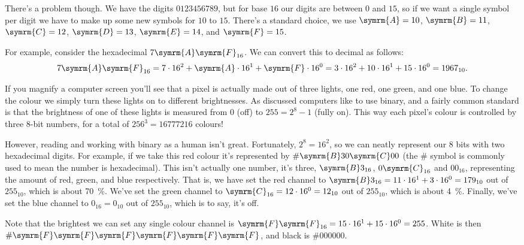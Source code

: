 \documentclass[fleqn]{LectureClass/LectureClass}
\newcommand{\hexadecimaldigit}[1]{\symrm{#1}}
\begin{document}
    There's a problem though.
    We have the digits \(0123456789\), but for base \(16\) our digits are between \(0\) and \(15\), so if we want a single symbol per digit we have to make up some new symbols for \(10\) to \(15\).
    There's a standard choice, we use \(\hexadecimaldigit{A} = 10\), \(\hexadecimaldigit{B} = 11\), \(\hexadecimaldigit{C} = 12\), \(\hexadecimaldigit{D} = 13\), \(\hexadecimaldigit{E} = 14\), and \(\hexadecimaldigit{F} = 15\).
    
    For example, consider the hexadecimal \(7\hexadecimaldigit{A}\hexadecimaldigit{F}_{16}\).
    We can convert this to decimal as follows:
    \begin{equation}
        7\hexadecimaldigit{A}\hexadecimaldigit{F}_{16} = 7 \cdot 16^2 + \hexadecimaldigit{A} \cdot 16^1 + \hexadecimaldigit{F} \cdot 16^0 = 3 \cdot 16^2 + 10 \cdot 16^1 + 15 \cdot 16^0 = 1967_{10}.
    \end{equation}
    
    \begin{app}{}{}
        If you magnify a computer screen you'll see that a pixel is actually made out of three lights, one red, one green, and one blue.
        To change the colour we simply turn these lights on to different brightnesses.
        As discussed computers like to use binary, and a fairly common standard is that the brightness of one of these lights is measured from \(0\) (off) to \(255 = 2^8 - 1\) (fully on).
        This way each pixel's colour is controlled by three \(8\)-bit numbers, for a total of \(256^3 = \num{16777216}\) colours!
        
        However, reading and working with binary as a human isn't great.
        Fortunately, \(2^8 = 16^2\), so we can neatly represent our \(8\) bits with two hexadecimal digits.
        For example, if we take \textcolor{glasgowPillarbox}{this red colour} it's represented by \(\#\hexadecimaldigit{B}30\hexadecimaldigit{C}00\) (the \(\#\) symbol is commonly used to mean the number is hexadecimal).
        This isn't actually one number, it's three, \(\hexadecimaldigit{B}3_{16}\), \(0\hexadecimaldigit{C}_{16}\) and \(00_{16}\), representing the amount of red, green, and blue respectively.
        That is, we have set the red channel to \(\hexadecimaldigit{B}3_{16} = 11 \cdot 16^1 + 3 \cdot 16^0 = 179_{10}\) out of \(255_{10}\), which is about \qty{70}{\percent}.
        We've set the green channel to \(\hexadecimaldigit{C}_{16} = 12 \cdot 16^0 = 12_{10}\) out of \(255_{10}\), which is about \qty{4}{\percent}.
        Finally, we've set the blue channel to \(0_{16} = 0_{10}\) out of \(255_{10}\), which is to say, it's off.
        
        Note that the brightest we can set any single colour channel is \(\hexadecimaldigit{F}\hexadecimaldigit{F}_{16} = 15 \cdot 16^1 + 15 \cdot 16^0 = 255\).
        White is then \(\#\hexadecimaldigit{F}\hexadecimaldigit{F}\hexadecimaldigit{F}\hexadecimaldigit{F}\hexadecimaldigit{F}\hexadecimaldigit{F}\), and black is \(\#000000\).
    \end{app}
    
\end{document}
